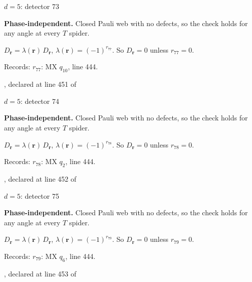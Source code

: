 \label{d5_det073}
{\Large $d=5$: detector 73}\par
\textbf{Phase-independent.} Closed Pauli web with no defects, so the check holds for any angle at every $T$ spider.
\begin{center}
\end{center}
\vspace{-1mm}
$D_{\boldsymbol r}=\lambda(\boldsymbol r)\,D_{\boldsymbol r}$, \quad $\lambda(\boldsymbol r)=(-1)^{r_{77}}$. \qquad So $D_{\boldsymbol r}=0$ unless $r_{77}=0$.
\par\smallskip\begin{minipage}{.98\linewidth}\small Records: $r_{77}$: MX $q_{10}$, line 444.\end{minipage}
\vfill
{\footnotesize\texttt{}, declared at line 451 of \texttt{}}
\newpage

\label{d5_det074}
{\Large $d=5$: detector 74}\par
\textbf{Phase-independent.} Closed Pauli web with no defects, so the check holds for any angle at every $T$ spider.
\begin{center}
\end{center}
\vspace{-1mm}
$D_{\boldsymbol r}=\lambda(\boldsymbol r)\,D_{\boldsymbol r}$, \quad $\lambda(\boldsymbol r)=(-1)^{r_{78}}$. \qquad So $D_{\boldsymbol r}=0$ unless $r_{78}=0$.
\par\smallskip\begin{minipage}{.98\linewidth}\small Records: $r_{78}$: MX $q_{2}$, line 444.\end{minipage}
\vfill
{\footnotesize\texttt{}, declared at line 452 of \texttt{}}
\newpage

\label{d5_det075}
{\Large $d=5$: detector 75}\par
\textbf{Phase-independent.} Closed Pauli web with no defects, so the check holds for any angle at every $T$ spider.
\begin{center}
\end{center}
\vspace{-1mm}
$D_{\boldsymbol r}=\lambda(\boldsymbol r)\,D_{\boldsymbol r}$, \quad $\lambda(\boldsymbol r)=(-1)^{r_{79}}$. \qquad So $D_{\boldsymbol r}=0$ unless $r_{79}=0$.
\par\smallskip\begin{minipage}{.98\linewidth}\small Records: $r_{79}$: MX $q_{6}$, line 444.\end{minipage}
\vfill
{\footnotesize\texttt{}, declared at line 453 of \texttt{}}
\newpage

